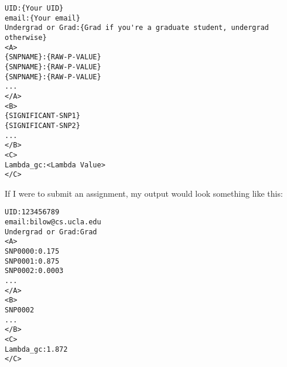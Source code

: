 \documentclass{article}
\begin{document}
\begin{verbatim}
UID:{Your UID}
email:{Your email}
Undergrad or Grad:{Grad if you're a graduate student, undergrad otherwise}
<A>
{SNPNAME}:{RAW-P-VALUE}
{SNPNAME}:{RAW-P-VALUE}
{SNPNAME}:{RAW-P-VALUE}
...
</A>
<B>
{SIGNIFICANT-SNP1}
{SIGNIFICANT-SNP2}
...
</B>
<C>
Lambda_gc:<Lambda Value>
</C>
\end{verbatim}

If I were to submit an assignment, my output
would look something like this:

\begin{verbatim}
UID:123456789
email:bilow@cs.ucla.edu
Undergrad or Grad:Grad
<A>
SNP0000:0.175
SNP0001:0.875
SNP0002:0.0003
...
</A>
<B>
SNP0002
...
</B>
<C>
Lambda_gc:1.872
</C>
\end{verbatim}


\clearpage
\end{document}
